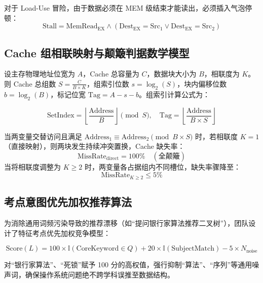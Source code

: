 \documentclass[UTF8,a4paper,11pt]{ctexart}
\begin{document}
对于 Load-Use 冒险，由于数据必须在 MEM 级结束才能读出，必须插入气泡停顿：
\begin{equation}
\text{Stall} = \text{MemRead}_{\text{EX}} \land (\text{Dest}_{\text{EX}} = \text{Src}_1 \lor \text{Dest}_{\text{EX}} = \text{Src}_2)
\end{equation}

\subsection{Cache 组相联映射与颠簸判据数学模型}
设主存物理地址位宽为 $A$，Cache 总容量为 $C$，数据块大小为 $B$，相联度为 $K$。则 Cache 总组数 $S = \frac{C}{B \times K}$，组索引位数 $s = \log_2(S)$，块内偏移位数 $b = \log_2(B)$，标记位宽 $\text{Tag} = A - s - b$。组索引计算公式为：

\begin{equation}
\text{SetIndex} = \left\lfloor \frac{\text{Address}}{B} \right\rfloor \pmod{S}, \quad \text{Tag} = \left\lfloor \frac{\text{Address}}{B \times S} \right\rfloor
\end{equation}

当两变量交替访问且满足 $\text{Address}_1 \equiv \text{Address}_2 \pmod{B \times S}$ 时，若相联度 $K=1$（直接映射），则两块发生持续冲突置换，Cache 缺失率：
\begin{equation}
\text{MissRate}_{\text{direct}} = 100\% \quad (\text{全颠簸})
\end{equation}
当将相联度调整为 $K \ge 2$ 时，两变量各占据组内不同槽位，缺失率骤降至：
\begin{equation}
\text{MissRate}_{K\ge 2} \le 5\%
\end{equation}

\subsection{考点意图优先加权推荐算法}
为消除通用词频污染导致的推荐漂移（如“提问银行家算法推荐二叉树”），团队设计了特征考点优先加权竞争模型：

\begin{equation}
\text{Score}(L) = 100 \times \mathbb{I}(\text{CoreKeyword} \in Q) + 20 \times \mathbb{I}(\text{SubjectMatch}) - 5 \times N_{\text{noise}}
\end{equation}

对“银行家算法”、“死锁”赋予 100 分的高权值，强行抑制“算法”、“序列”等通用噪声词，确保操作系统问题绝不跨学科误推至数据结构。

\end{document}
